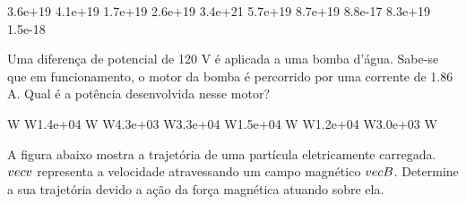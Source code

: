 \documentclass[12pt, addpoints]{exam}
\begin{document}
\begin{questions}
\begin{multicols*}{2}
\begin{oneparchoices}
\choice 3.6e+19 \choice 4.1e+19 \choice 1.7e+19 \choice 2.6e+19 \choice 3.4e+21 \choice 5.7e+19 \choice 8.7e+19 \choice 8.8e-17 \choice 8.3e+19 \choice 1.5e-18 
\end{oneparchoices}\question Uma diferença de potencial de 120 V é aplicada a uma bomba d’água. Sabe-se que em funcionamento, o motor da bomba é percorrido por uma corrente de    1.86 A. Qual é a potência desenvolvida nesse motor?

\begin{oneparchoices}
 W W\choice 1.4e+04 W W\choice 4.3e+03 W\choice 3.3e+04 W\choice 1.5e+04 W W\choice 1.2e+04 W\choice 3.0e+03 W
\end{oneparchoices}\question A ﬁgura abaixo mostra a trajetória de uma partícula eletricamente carregada. $\\vec{{v}}$ representa a velocidade atravessando um campo magnético $\\vec{{B}}$. Determine a sua trajetória devido a ação da força magnética atuando sobre ela.
        
        \begin{center}
            \begin{minipage}[c]{0.5\linewidth}
            \end{minipage}
        \end{center}


\end{multicols*}
\end{questions}
\end{document}
